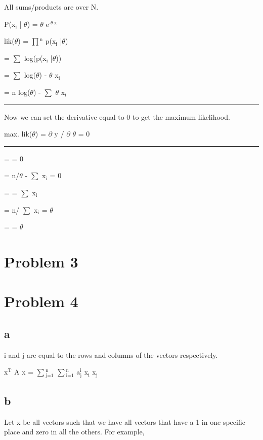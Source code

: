 \documentclass[11pt]{article}
\begin{document}
All sums/products are over N.

P(x$_{\text{i}}$ | $\theta$) = $\theta$ e$^{\text{-}\theta\ \text{x}}$

lik($\theta$) = $\prod$$^{\text{n}}$ p(x$_{\text{i}}$ |$\theta$)

= $\sum$ log(p(x$_{\text{i}}$ |$\theta$))

= $\sum$ log($\theta$) - $\theta$ x$_{\text{i}}$

= n log($\theta$) - $\sum$ $\theta$ x$_{\text{i}}$

\rule{\linewidth}{0.5pt}

Now we can set the derivative equal to 0 to get the maximum likelihood.

max. lik($\theta$) = $\partial$ y / $\partial$ $\theta$ = 0

\rule{\linewidth}{0.5pt}

=  = 0

= n/$\theta$ - $\sum$ x$_{\text{i}}$ = 0

=  = $\sum$ x$_{\text{i}}$

= n/ $\sum$ x$_{\text{i}}$ = $\theta$

=  = $\theta$


\section{Problem 3}
\label{sec-3}


\section{Problem 4}
\label{sec-4}
\subsection{a}
\label{sec-4-1}
i and j are equal to the rows and columns of the vectors respectively.

x$^{\text{T}}$ A x = $\sum$$_{\text{j=1}}^{\text{n}}$ $\sum$$_{\text{i=1}}^{\text{n}}$ a$_{\text{j}}^{\text{i}}$ x$_{\text{i}}$ x$_{\text{j}}$


\subsection{b}
\label{sec-4-2}

Let x be all vectors such that we have all vectors that have a 1 in one specific place and zero in all the others. For example,
\end{document}
